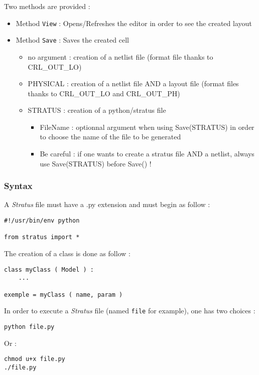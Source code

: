 \indent Two methods are provided :
\begin{itemize}
    \item Method \verb-View- : Opens/Refreshes the editor in order to see the created layout
    \item Method \verb-Save- : Saves the created cell
    \begin{itemize}
        \item no argument : creation of a netlist file (format file thanks to CRL\_OUT\_LO)
        \item PHYSICAL : creation of a netlist file AND a layout file (format files thanks to CRL\_OUT\_LO and CRL\_OUT\_PH)
        \item STRATUS : creation of a python/stratus file
        \begin{itemize}
            \item FileName : optionnal argument when using Save(STRATUS) in order to choose the name of the file to be generated
            \item Be careful : if one wants to create a stratus file AND a netlist, always use Save(STRATUS) before Save() !
        \end{itemize}
    \end{itemize}
\end{itemize}

\subsubsection{Syntax}

A \emph{Stratus} file must have a .py extension and must begin as follow :
\begin{verbatim}
#!/usr/bin/env python

from stratus import *
\end{verbatim}

\indent The creation of a class is done as follow :
\begin{verbatim}
class myClass ( Model ) :
    ...
    
exemple = myClass ( name, param )
\end{verbatim}

\indent In order to execute a \emph{Stratus} file (named \verb-file- for example), one has two choices :
\begin{verbatim}
python file.py
\end{verbatim}
\indent Or :
\begin{verbatim}
chmod u+x file.py
./file.py
\end{verbatim}


